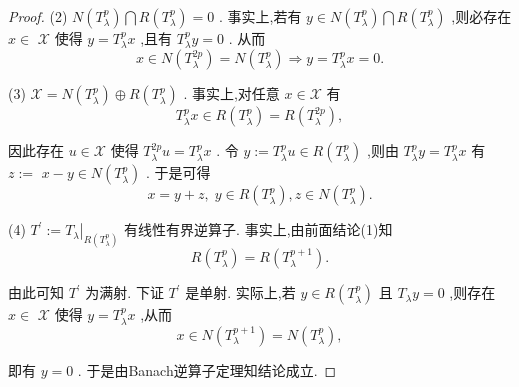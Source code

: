 \documentclass[lang=cn,newtx,10pt,scheme=chinese,thmcnt=chapter]{elegantbook}
\begin{document}
\begin{proof}
(2) \(N\left( {T}_{\lambda }^{p}\right) \bigcap R\left( {T}_{\lambda }^{p}\right)  = 0\) . 事实上,若有 \(y \in  N\left( {T}_{\lambda }^{p}\right) \bigcap R\left( {T}_{\lambda }^{p}\right)\) ,则必存在 \(x \in\)  \(\mathcal{X}\) 使得 \(y = {T}_{\lambda }^{p}x\) ,且有 \({T}_{\lambda }^{p}y = 0\) . 从而
\begin{equation*}
x \in  N\left( {T}_{\lambda }^{2p}\right)  = N\left( {T}_{\lambda }^{p}\right)  \Rightarrow  y = {T}_{\lambda }^{p}x = 0.
\end{equation*}

(3) \(\mathcal{X} = N\left( {T}_{\lambda }^{p}\right)  \oplus  R\left( {T}_{\lambda }^{p}\right)\) . 事实上,对任意 \(x \in  \mathcal{X}\) 有
\begin{equation*}
{T}_{\lambda }^{p}x \in  R\left( {T}_{\lambda }^{p}\right)  = R\left( {T}_{\lambda }^{2p}\right) ,
\end{equation*}

因此存在 \(u \in  \mathcal{X}\) 使得 \({T}_{\lambda }^{2p}u = {T}_{\lambda }^{p}x\) . 令 \(y \mathrel{\text{ := }} {T}_{\lambda }^{p}u \in  R\left( {T}_{\lambda }^{p}\right)\) ,则由 \({T}_{\lambda }^{p}y = {T}_{\lambda }^{p}x\) 有 \(z \mathrel{\text{ := }}\)  \(x - y \in  N\left( {T}_{\lambda }^{p}\right)\) . 于是可得
\begin{equation*}
x = y + z,\;y \in  R\left( {T}_{\lambda }^{p}\right) ,z \in  N\left( {T}_{\lambda }^{p}\right) .
\end{equation*}

(4) \({T}^{\prime } \mathrel{\text{ := }} {\left. {T}_{\lambda }\right| }_{R\left( {T}_{\lambda }^{p}\right) }\) 有线性有界逆算子. 事实上,由前面结论(1)知
\begin{equation*}
R\left( {T}_{\lambda }^{p}\right)  = R\left( {T}_{\lambda }^{p + 1}\right) .
\end{equation*}

由此可知 \({T}^{\prime }\) 为满射. 下证 \({T}^{\prime }\) 是单射. 实际上,若 \(y \in  R\left( {T}_{\lambda }^{p}\right)\) 且 \({T}_{\lambda }y = 0\) ,则存在 \(x \in\)  \(\mathcal{X}\) 使得 \(y = {T}_{\lambda }^{p}x\) ,从而
\begin{equation*}
x \in  N\left( {T}_{\lambda }^{p + 1}\right)  = N\left( {T}_{\lambda }^{p}\right) ,
\end{equation*}

即有 \(y = 0\) . 于是由Banach逆算子定理知结论成立.

\end{proof}
\end{document}
